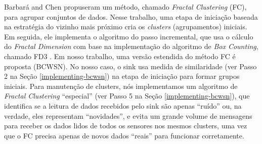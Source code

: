 \documentclass{acm_proc_article-sp}
\begin{document}
Barbará and Chen \cite{Barbara2000} propuseram um método, chamado {\it Fractal
Clustering} (FC), para agrupar conjuntos de dados.
Nesse trabalho, uma etapa de iniciação baseada na estratégia do vizinho mais
próximo cria os {\it clusters} (agrupamentos) iniciais. Em seguida, ele implementa o
algoritmo do passo incremental, que usa o cálculo do \textit{Fractal Dimension}
com base na implementação do algoritmo de \textit{Box Counting}, chamado FD3
\cite{Liebovitch1989}. Em nosso trabalho, uma versão estendida do método FC é
proposta (BCWSN). No nosso caso, o sink usa medida de similaridade (ver Passo 2
na Seção \ref{implementing-bcwsn}) na etapa de iniciação para formar grupos
iniciais. Para manutenção de clusters, nós implementamos um algoritmo de {\it Fractal
Clustering} “especial” (ver Passo 5 na Seção \ref{implementing-bcwsn}), que
identifica se a leitura de dados recebidos pelo sink são apenas ``ruído'' ou, na
verdade, eles representam ``novidades'', e evita um grande volume de mensagens
para receber os dados lidos de todos os sensores nos mesmos clusters, uma vez
que o FC precisa apenas de novos dados ``reais'' para funcionar corretamente.
\vspace*{-.3cm}
\end{document}
